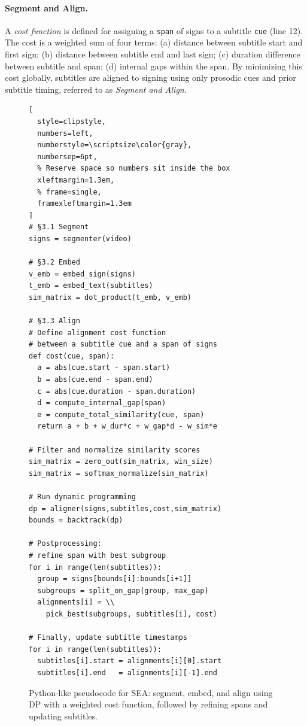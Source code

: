 \documentclass[11pt]{article}
\begin{document}
\paragraph{Segment and Align.} A \textit{cost function} is defined for assigning a \texttt{span} of signs to a subtitle \texttt{cue} (line 12). 
The cost is a weighted sum of four terms: (a) distance between subtitle start and first sign; (b) distance between subtitle end and last sign; (c) duration difference between subtitle and span; (d) internal gaps within the span. 
By minimizing this cost globally, subtitles are aligned to signing using only prosodic cues and prior subtitle timing, referred to as \textit{Segment and Align}.

\begin{figure}[ht]
\centering
\begin{minipage}{\linewidth}
\begin{lstlisting}[
  style=clipstyle,
  numbers=left,
  numberstyle=\scriptsize\color{gray},
  numbersep=6pt,
  % Reserve space so numbers sit inside the box
  xleftmargin=1.3em,
  % frame=single,
  framexleftmargin=1.3em
]
# §3.1 Segment
signs = segmenter(video)

# §3.2 Embed
v_emb = embed_sign(signs) 
t_emb = embed_text(subtitles) 
sim_matrix = dot_product(t_emb, v_emb)

# §3.3 Align
# Define alignment cost function 
# between a subtitle cue and a span of signs
def cost(cue, span):
  a = abs(cue.start - span.start)
  b = abs(cue.end - span.end)
  c = abs(cue.duration - span.duration)
  d = compute_internal_gap(span)
  e = compute_total_similarity(cue, span)
  return a + b + w_dur*c + w_gap*d - w_sim*e

# Filter and normalize similarity scores
sim_matrix = zero_out(sim_matrix, win_size)
sim_matrix = softmax_normalize(sim_matrix)

# Run dynamic programming
dp = aligner(signs,subtitles,cost,sim_matrix)
bounds = backtrack(dp)

# Postprocessing: 
# refine span with best subgroup
for i in range(len(subtitles)):
  group = signs[bounds[i]:bounds[i+1]]
  subgroups = split_on_gap(group, max_gap)
  alignments[i] = \\
    pick_best(subgroups, subtitles[i], cost)

# Finally, update subtitle timestamps
for i in range(len(subtitles)):
  subtitles[i].start = alignments[i][0].start
  subtitles[i].end   = alignments[i][-1].end
\end{lstlisting}
\end{minipage}
\caption{Python-like pseudocode for SEA: segment, embed, and align using DP with a weighted cost function, followed by refining spans and updating subtitles.}
\label{fig:sea_pseudocode}
\end{figure}
\end{document}
